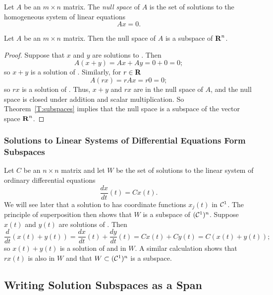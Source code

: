 \documentclass{ximera}
\begin{document}
\begin{Def} \label{D:nullspace}
Let $A$ be an $m\times n$ matrix.  The {\em null space\/} of $A$
is the set of solutions to the homogeneous system of linear equations
\begin{equation} \label{Ax=0}
Ax=0.
\end{equation}
\end{Def} 

\begin{lemma}
Let $A$ be an $m\times n$ matrix.  Then the null space of $A$
is a subspace of $\mbox{$\bf{R}$}^n$.
\end{lemma}

\begin{proof}
Suppose that $x$ and $y$ are solutions to .  Then
\[
A(x+y) = Ax+Ay = 0+0 = 0;
\]
so $x+y$ is a solution of .  Similarly, for $r\in\mbox{$\bf{R}$}$
\[
A(rx) = rAx = r0 = 0;
\]
so $rx$ is a solution of .  Thus, $x+y$ and $rx$ are
in the null space of $A$, and the null space is closed under addition 
and scalar multiplication.  So Theorem~\ref{T:subspaces} implies that
the null space is a subspace of the vector space $\mbox{$\bf{R}$}^n$.   \end{proof}

\subsubsection*{Solutions to Linear Systems of Differential Equations Form
Subspaces}

Let $C$ be an $n\times n$ matrix and let $W$ be the set of solutions to
the linear system of ordinary differential equations
\begin{equation} \label{Cx(t)}
\frac{dx}{dt}(t) = Cx(t).
\end{equation}
We will see later that a solution to  has coordinate
functions $x_j(t)$ in ${\cal C}^1$.  The principle of superposition
then shows that $W$ is a subspace of $({\cal C}^1)^n$.  Suppose
$x(t)$ and $y(t)$ are solutions of .  Then
\[
\frac{d}{dt}(x(t)+y(t)) = \frac{dx}{dt}(t) + \frac{dy}{dt}(t) =
Cx(t) + Cy(t) = C(x(t)+y(t));
\]
so $x(t)+y(t)$ is a solution of  and in $W$.  A
similar calculation shows that $rx(t)$ is also in $W$ and
that $W\subset({\cal C}^1)^n$ is a subspace.


\subsection*{Writing Solution Subspaces as a Span}
\end{document}

